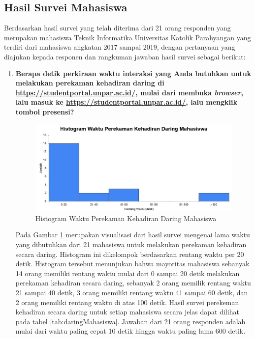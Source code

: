 \documentclass[a4paper,twoside]{article}
\begin{document}
\begin{enumerate}
		\subsection{Hasil Survei Mahasiswa}
		Berdasarkan hasil survei yang telah diterima dari 21 orang responden yang merupakan mahasiswa Teknik Informatika Universitas Katolik
		Parahyangan yang terdiri dari mahasiswa angkatan 2017 sampai 2019, dengan pertanyaan yang diajukan kepada responen dan rangkuman jawaban hasil survei sebagai berikut:
		\begin{enumerate}
			\item \textbf{Berapa detik perkiraan waktu interaksi yang Anda butuhkan untuk melakukan perekaman kehadiran daring di \url{https://studentportal.unpar.ac.id/}, mulai dari membuka \textit{browser}, lalu masuk ke \url{https://studentportal.unpar.ac.id/}, lalu mengklik tombol presensi?}
			\begin{figure}[H]
				\centering
				\includegraphics[scale=0.6]{Gambar/DaringMahasiswa.jpg}
				\caption{Histogram Waktu Perekaman Kehadiran Daring Mahasiswa} 
				\label{fig:DaringMahasiswa}
			\end{figure}
			Pada Gambar \ref{fig:DaringMahasiswa} merupakan visualisasi dari hasil survei mengenai lama waktu yang dibutuhkan dari 21 mahasiswa untuk melakukan perekaman kehadiran secara daring. Histogram ini dikelompok berdasarkan rentang waktu per 20 detik. Histogram tersebut menunjukan bahwa mayoritas mahasiswa sebanyak 14 orang memiliki rentang waktu mulai dari 0 sampai 20 detik melakukan perekaman kehadiran secara daring, sebanyak 2 orang memilik rentang waktu 21 sampai 40 detik, 3 orang memiliki rentang waktu 41 sampai 60 detik, dan 2 orang memiliki rentang waktu di atas 100 detik. Hasil survei perekeman kehadiran secara daring untuk setiap mahasiswa secara jelas dapat dilihat pada tabel \ref{tab:daringMahasiswa}. 
			Jawaban dari 21 orang responden adalah mulai dari waktu paling cepat 10 detik hingga waktu paling lama 600 detik.\\ \\

\end{enumerate}
\end{enumerate}
\end{document}
